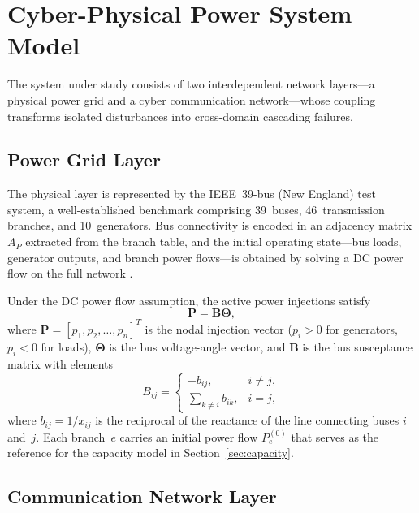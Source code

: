 \documentclass[a4paper,fleqn]{cas-dc}
\begin{document}
\section{Cyber-Physical Power System Model}\label{sec:model}

The system under study consists of two interdependent network layers---a
physical power grid and a cyber communication network---whose coupling
transforms isolated disturbances into cross-domain cascading failures.

\subsection{Power Grid Layer}\label{sec:power}

The physical layer is represented by the IEEE~39-bus (New England) test
system, a well-established benchmark comprising 39~buses,
46~transmission branches, and 10~generators.  Bus connectivity is
encoded in an adjacency matrix $A_P$ extracted from the branch table,
and the initial operating state---bus loads, generator outputs, and
branch power flows---is obtained by solving a DC power flow on the full
network \citep{Zimmerman2011matpower}.

Under the DC power flow assumption, the active power injections satisfy
\begin{equation}\label{eq:dcpf}
  \mathbf{P} = \mathbf{B}\boldsymbol{\Theta},
\end{equation}
where $\mathbf{P}=[p_1,p_2,\dots,p_n]^{T}$ is the nodal injection
vector ($p_i>0$ for generators, $p_i<0$ for loads),
$\boldsymbol{\Theta}$ is the bus voltage-angle vector, and $\mathbf{B}$
is the bus susceptance matrix with elements
\begin{equation}
  B_{ij}=\begin{cases}
    -b_{ij}, & i\ne j,\\[4pt]
    \displaystyle\sum_{k\ne i}b_{ik}, & i=j,
  \end{cases}
\end{equation}
where $b_{ij}=1/x_{ij}$ is the reciprocal of the reactance of the
line connecting buses $i$ and~$j$.  Each branch~$e$ carries an initial
power flow $P_e^{(0)}$ that serves as the reference for the capacity
model in Section~\ref{sec:capacity}.

\subsection{Communication Network Layer}\label{sec:cyber}
\end{document}
